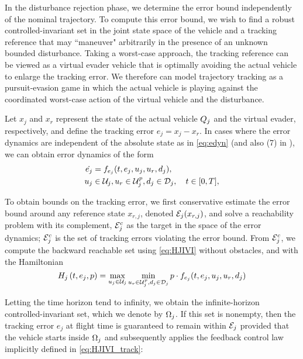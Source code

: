 In the disturbance rejection phase, we determine the error bound independently of the nominal trajectory. To compute this error bound, we wish to find a robust controlled-invariant set in the joint state space of the vehicle and a tracking reference that may ``maneuver" arbitrarily in the presence of an unknown bounded disturbance. Taking a worst-case approach, the tracking reference can be viewed as a virtual evader vehicle that is optimally avoiding the actual vehicle to enlarge the tracking error. We therefore can model trajectory tracking as a pursuit-evasion game in which the actual vehicle is playing against the coordinated worst-case action of the virtual vehicle and the disturbance. 

Let $x_j$ and $x_r$ represent the state of the actual vehicle $Q_{j}$ and the virtual evader, respectively, and define the tracking error $e_j=x_j-x_r$. In cases where the error dynamics are independent of the absolute state as in \eqref{eq:edyn} (and also (7) in \cite{Mitchell05}), we can obtain error dynamics of the form
\begin{equation}
\label{eq:edyn} %
\begin{aligned}
\dot{e_j} &= f_{e_j}(t, e_j, u_j, u_r,d_j), \\
u_j &\in \cset_j, u_r\in\cset^p_j, d_j \in \dset_j, \quad t \in [0, T],
\end{aligned}
\end{equation}

To obtain bounds on the tracking error, we first conservative estimate the error bound around any reference state $x_{r,j}$, denoted $\mathcal{E}_j(x_{r,j})$, and solve a reachability problem with its complement, $\mathcal{E}_j^c$ as the target in the space of the error dynamics; $\mathcal{E}_j^c$ is the set of tracking errors violating the error bound. From $\mathcal{E}_j^c$, we compute the backward reachable set using \eqref{eq:HJIVI} without obstacles, and with the Hamiltonian
\vspace{-0.5em}
\begin{equation}
\label{eq:HJIVI_track}
H_j\left(t, e_j, p\right) = \max_{u_j \in \cset_j} \min_{u_r \in\cset^p_j, d_j \in \dset_j} p \cdot f_{e_j}(t, e_j, u_j, u_r,d_j)
\end{equation}

Letting the time horizon tend to infinity, we obtain the infinite-horizon controlled-invariant set, which we denote by $\Omega_j$. If this set is nonempty, then the tracking error $e_j$ at flight time is guaranteed to remain within $\mathcal{E}_j$ provided that the vehicle starts inside $\Omega_j$ and subsequently applies the feedback control law implicitly defined in \eqref{eq:HJIVI_track}:

